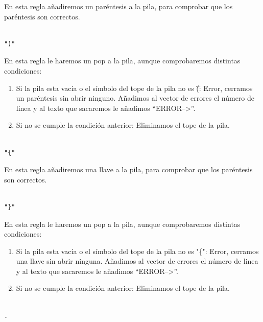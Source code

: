 \documentclass[12pt, spanish]{article}
\begin{document}
En esta regla añadiremos un paréntesis a la pila, para comprobar que los paréntesis son correctos.


\begin{verbatim}

")" 

\end{verbatim}

En esta regla le haremos un pop a la pila, aunque comprobaremos distintas condiciones:

\begin{enumerate}
	\item Si la pila esta vacía o el símbolo del tope de la pila no es \"(\": Error, cerramos un paréntesis sin abrir ninguno. Añadimos al vector de errores el número de linea y al texto que sacaremos le añadimos ``ERROR-->''.
	\item Si no se cumple la condición anterior: Eliminamos  el tope de la pila.
\end{enumerate}


\begin{verbatim}

"{" 

\end{verbatim}

En esta regla añadiremos una llave a la pila, para comprobar que los paréntesis son correctos.



\begin{verbatim}

"}"

\end{verbatim}

En esta regla le haremos un pop a la pila, aunque comprobaremos distintas condiciones:

\begin{enumerate}
	\item Si la pila esta vacía o el símbolo del tope de la pila no es "\{": Error, cerramos una llave sin abrir ninguna. Añadimos al vector de errores el número de linea y al texto que sacaremos le añadimos ``ERROR-->''.
	\item Si no se cumple la condición anterior: Eliminamos  el tope de la pila.
\end{enumerate}


\begin{verbatim}

.

\end{verbatim}
\end{document}
